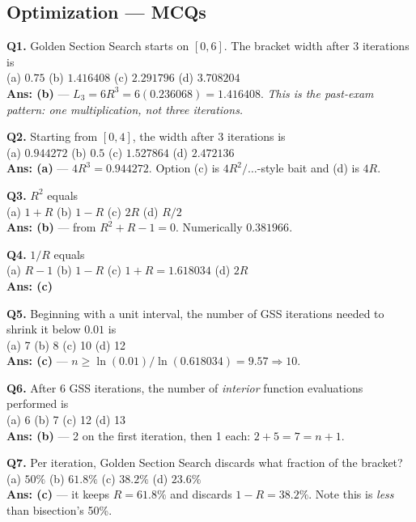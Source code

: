 \subsection{Optimization --- MCQs}

\begin{mcqbox}
\textbf{Q1.} Golden Section Search starts on $[0,6]$. The bracket width after 3 iterations is\\
(a) $0.75$ \quad (b) $1.416408$ \quad (c) $2.291796$ \quad (d) $3.708204$\\
\textbf{Ans: (b)} --- $L_3 = 6R^3 = 6(0.236068) = 1.416408$. \emph{This is the past-exam pattern: one multiplication, not three iterations.}

\textbf{Q2.} Starting from $[0,4]$, the width after 3 iterations is\\
(a) $0.944272$ \quad (b) $0.5$ \quad (c) $1.527864$ \quad (d) $2.472136$\\
\textbf{Ans: (a)} --- $4R^3 = 0.944272$. Option (c) is $4R^2/\ldots$-style bait and (d) is $4R$.

\textbf{Q3.} $R^2$ equals\\
(a) $1+R$ \quad (b) $1-R$ \quad (c) $2R$ \quad (d) $R/2$\\
\textbf{Ans: (b)} --- from $R^2+R-1 = 0$. Numerically $0.381966$.

\textbf{Q4.} $1/R$ equals\\
(a) $R-1$ \quad (b) $1-R$ \quad (c) $1+R = 1.618034$ \quad (d) $2R$\\
\textbf{Ans: (c)}

\textbf{Q5.} Beginning with a unit interval, the number of GSS iterations needed to shrink it below $0.01$ is\\
(a) 7 \quad (b) 8 \quad (c) 10 \quad (d) 12\\
\textbf{Ans: (c)} --- $n \ge \ln(0.01)/\ln(0.618034) = 9.57 \Rightarrow 10$.

\textbf{Q6.} After 6 GSS iterations, the number of \emph{interior} function evaluations performed is\\
(a) 6 \quad (b) 7 \quad (c) 12 \quad (d) 13\\
\textbf{Ans: (b)} --- 2 on the first iteration, then 1 each: $2 + 5 = 7 = n+1$.

\textbf{Q7.} Per iteration, Golden Section Search discards what fraction of the bracket?\\
(a) $50\%$ \quad (b) $61.8\%$ \quad (c) $38.2\%$ \quad (d) $23.6\%$\\
\textbf{Ans: (c)} --- it keeps $R = 61.8\%$ and discards $1-R = 38.2\%$. Note this is \emph{less} than bisection's 50\%.


\end{mcqbox}
